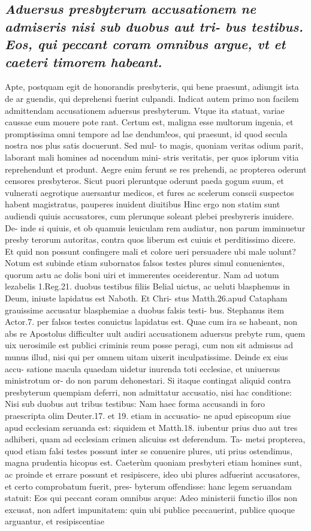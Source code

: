 \documentclass{article}
\begin{document}
\begin{pages}
\subsection*{\textit{Aduersus presbyterum accusationem ne admiseris nisi sub duobus aut tri- bus testibus. Eos, qui peccant coram omnibus argue, vt et caeteri timorem habeant. }}\pstart Apte, postquam egit de honorandis presbyteris, qui bene praesunt, adiungit ista de ar guendis, qui deprehensi fuerint culpandi. Indicat autem primo non facilem admittendam accusationem aduersus presbyterum. Vtque ita statuat, variae caussae eum mouere pote rant. Certum est, maligna esse multorum ingenia, et promptissima omni tempore ad lae dendum!eos, qui praesunt, id quod secula nostra nos plus satis docuerunt. Sed mul- to magis, quoniam veritas odium parit, laborant mali homines ad nocendum mini- stris veritatis, per quos iplorum vitia reprehendunt et produnt. Aegre enim ferunt se res prehendi, ac propterea oderunt censores presbyteros. Sicut puori pleruntque oderunt paeda gogum suum, et vulnerati aegrotique auersantur medicos, et fures ac scelerum conscii suspectos habent magistratus, pauperes inuident diuitibus Hinc ergo non statim sunt audiendi quiuis accusatores, cum plerunque soleant plebei presbyreris inuidere. De- inde si quiuis, et ob quamuis leuiculam rem audiatur, non parum imminuetur presby terorum autoritas, contra quos liberum est cuiuis et perditissimo dicere. Et quid non possunt confingere mali et colore ueri persuadere ubi male uolunt? Notum est subinde etiam subornatos falsos testes plures simul conuenientes, quorum astu ac dolis boni uiri et immerentes oceiderentur. Nam ad uotum lezabelis 1.Reg.21. duobus testibus filiis Belial uictus, ac ueluti blasphemus in Deum, iniuste lapidatus est Naboth. Et Chri- stus Matth.26.apud Catapham grauissime accusatur blasphemiae a duobus falsis testi- bus. Stephanus item Actor.7. per falsos testes conuictus lapidatus est. Quae cum ira se habeant, non abs re Apostolus difficulter uult audiri accusationem aduersus prebyte rum, quem uix uerosimile est publici criminis reum posse peragi, cum non sit admissus ad munus illud, nisi qui per omnem uitam uixerit inculpatissime. Deinde ex eius accu- satione macula quaedam uidetur inurenda toti ecclesiae, et uniuersus ministrotum or- do non parum dehonestari. Si itaque contingat aliquid contra presbyterum quempiam deferri, non admittatur accusatio, nisi hac conditione: Nisi sub duobus aut tribus testibus: Nam haec forma accusandi in foro praescripta olim Deuter.17. et 19. etiam in accusatio- ne apud episcopum siue apud ecclesiam seruanda est: siquidem et Matth.18. iubentur prius duo aut tres adhiberi, quam ad ecclesiam crimen alicuius est deferendum. Ta- metsi propterea, quod etiam falsi testes possunt inter se conuenire plures, uti prius ostendimus, magna prudentia hicopus est.  \pend\pstart Caeterùm quoniam presbyteri etiam homines sunt, ac proinde et errare possunt et resipiscere, ideo ubi plures adfuerint accusatores, et certo comprobatum fuerit, pres- byterum offendisse: hanc legem seruandam statuit: Eos qui peccant coram omnibus arque: Adeo ministerii functio illos non excusat, non adfert impunitatem: quin ubi publice peccauerint, publice quoque arguantur, et resipiscentiae 
\end{pages}
\end{document}
